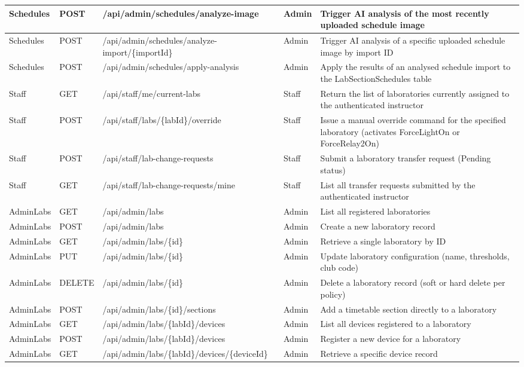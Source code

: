 {\begin{longtable}{|L{1.8cm}|L{0.8cm}|L{5.2cm}|L{1.8cm}|L{4.5cm}|}
\hline
Schedules & POST & /api/admin/schedules/analyze-image & Admin & Trigger AI analysis of the most recently uploaded schedule image \\
\hline
Schedules & POST & /api/admin/schedules/analyze-import/\{importId\} & Admin & Trigger AI analysis of a specific uploaded schedule image by import ID \\
\hline
Schedules & POST & /api/admin/schedules/apply-analysis & Admin & Apply the results of an analysed schedule import to the LabSectionSchedules table \\
\hline
Staff & GET & /api/staff/me/current-labs & Staff & Return the list of laboratories currently assigned to the authenticated instructor \\
\hline
Staff & POST & /api/staff/labs/\{labId\}/override & Staff & Issue a manual override command for the specified laboratory (activates ForceLightOn or ForceRelay2On) \\
\hline
Staff & POST & /api/staff/lab-change-requests & Staff & Submit a laboratory transfer request (Pending status) \\
\hline
Staff & GET & /api/staff/lab-change-requests/mine & Staff & List all transfer requests submitted by the authenticated instructor \\
\hline
AdminLabs & GET & /api/admin/labs & Admin & List all registered laboratories \\
\hline
AdminLabs & POST & /api/admin/labs & Admin & Create a new laboratory record \\
\hline
AdminLabs & GET & /api/admin/labs/\{id\} & Admin & Retrieve a single laboratory by ID \\
\hline
AdminLabs & PUT & /api/admin/labs/\{id\} & Admin & Update laboratory configuration (name, thresholds, club code) \\
\hline
AdminLabs & DELETE & /api/admin/labs/\{id\} & Admin & Delete a laboratory record (soft or hard delete per policy) \\
\hline
AdminLabs & POST & /api/admin/labs/\{id\}/sections & Admin & Add a timetable section directly to a laboratory \\
\hline
AdminLabs & GET & /api/admin/labs/\{labId\}/devices & Admin & List all devices registered to a laboratory \\
\hline
AdminLabs & POST & /api/admin/labs/\{labId\}/devices & Admin & Register a new device for a laboratory \\
\hline
AdminLabs & GET & /api/admin/labs/\{labId\}/devices/\{deviceId\} & Admin & Retrieve a specific device record \\

\end{longtable}}
